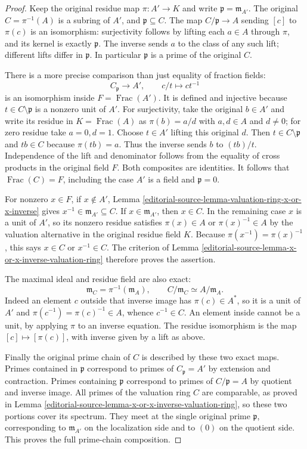 \begin{proof}
Keep the original residue map
$\pi:A'\to K$ and write
$\mathfrak p=\mathfrak m_{A'}$.
The original $C=\pi^{-1}(A)$
is a subring of $A'$,
and $\mathfrak p\subseteq C$.
The map $C/\mathfrak p\to A$
sending $[c]$ to $\pi(c)$
is an isomorphism: surjectivity
follows by lifting each $a\in A$
through $\pi$, and its kernel
is exactly $\mathfrak p$.
The inverse sends $a$ to
the class of any such lift;
different lifts differ in
$\mathfrak p$. In particular
$\mathfrak p$ is a prime
of the original $C$.

There is a more precise
comparison than just equality
of fraction fields:
$$
C_{\mathfrak p}\longrightarrow A',\qquad c/t\longmapsto c t^{-1}
$$
is an isomorphism inside
$F=\operatorname{Frac}(A')$.
It is defined and injective
because $t\in C\setminus\mathfrak p$
is a nonzero unit of $A'$.
For surjectivity, take the
original $b\in A'$ and
write its residue in
$K=\operatorname{Frac}(A)$
as $\pi(b)=a/d$ with
$a,d\in A$ and $d\neq0$;
for zero residue take $a=0,d=1$.
Choose $t\in A'$ lifting
this original $d$. Then
$t\in C\setminus\mathfrak p$
and $tb\in C$ because
$\pi(tb)=a$. Thus the
inverse sends $b$ to
$(tb)/t$. Independence of
the lift and denominator
follows from the equality
of cross products in the
original field $F$. Both
composites are identities.
It follows that
$\operatorname{Frac}(C)=F$,
including the case $A'$ is
a field and $\mathfrak p=0$.

For nonzero $x\in F$, if
$x\notin A'$, Lemma
\ref{editorial-source-lemma-valuation-ring-x-or-x-inverse}
gives $x^{-1}\in\mathfrak m_{A'}\subseteq C$.
If $x\in\mathfrak m_{A'}$,
then $x\in C$. In the
remaining case $x$ is a
unit of $A'$, so its
nonzero residue satisfies
$\pi(x)\in A$ or
$\pi(x)^{-1}\in A$ by the
valuation alternative in the
original residue field $K$.
Because $\pi(x^{-1})=\pi(x)^{-1}$,
this says $x\in C$ or
$x^{-1}\in C$. The criterion
of Lemma
\ref{editorial-source-lemma-x-or-x-inverse-valuation-ring}
therefore proves the assertion.

The maximal ideal and residue
field are also exact:
$$
\mathfrak m_C=\pi^{-1}(\mathfrak m_A),\qquad
C/\mathfrak m_C\simeq A/\mathfrak m_A.
$$
Indeed an element $c$ outside
that inverse image has
$\pi(c)\in A^*$, so it
is a unit of $A'$ and
$\pi(c^{-1})=\pi(c)^{-1}\in A$,
whence $c^{-1}\in C$.
An element inside cannot be
a unit, by applying $\pi$
to an inverse equation.
The residue isomorphism is
the map $[c]\mapsto[\pi(c)]$,
with inverse given by a
lift as above.

Finally the original prime
chain of $C$ is described
by these two exact maps.
Primes contained in $\mathfrak p$
correspond to primes of
$C_{\mathfrak p}=A'$ by
extension and contraction.
Primes containing $\mathfrak p$
correspond to primes of
$C/\mathfrak p=A$ by
quotient and inverse image.
All primes of the valuation
ring $C$ are comparable,
as proved in Lemma
\ref{editorial-source-lemma-x-or-x-inverse-valuation-ring},
so these two portions cover
its spectrum. They meet
at the single original prime
$\mathfrak p$, corresponding
to $\mathfrak m_{A'}$ on
the localization side and
to $(0)$ on the quotient
side. This proves the full
prime-chain composition.
\end{proof}

